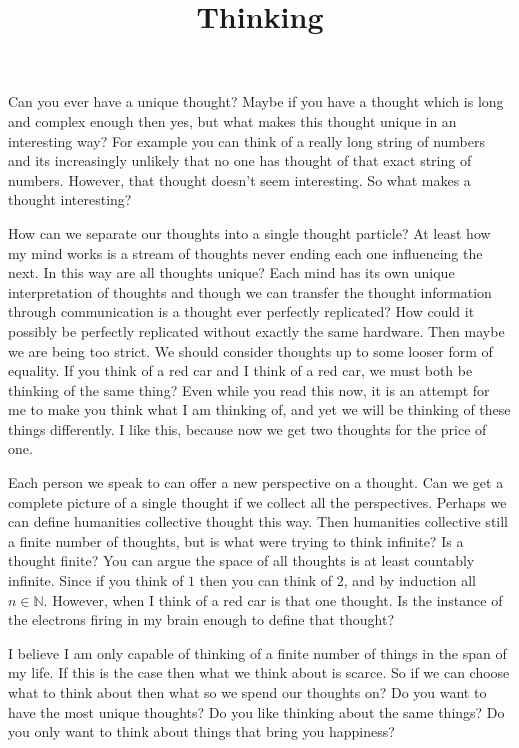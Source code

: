 \documentclass[11pt]{ekblite}
\begin{document}
\title{Thinking}
\maketitle


Can you ever have a unique thought? 
Maybe if you have a thought which is long and complex enough then yes, but what makes this thought unique in an interesting way?
For example you can think of a really long string of numbers and its increasingly unlikely that no one has thought of that exact string of numbers.
However, that thought doesn't seem interesting.
So what makes a thought interesting?

How can we separate our thoughts into a single thought particle?
At least how my mind works is a stream of thoughts never ending each one influencing the next.
In this way are all thoughts unique? 
Each mind has its own unique interpretation of thoughts and though we can transfer the thought information through communication is a thought ever perfectly replicated?
How could it possibly be perfectly replicated without exactly the same hardware.
Then maybe we are being too strict.
We should consider thoughts up to some looser form of equality.
If you think of a red car and I think of a red car, we must both be thinking of the same thing?
Even while you read this now, it is an attempt for me to make you think what I am thinking of, and yet we will be thinking of these things differently.
I like this, because now we get two thoughts for the price of one.

Each person we speak to can offer a new perspective on a thought. 
Can we get a complete picture of a single thought if we collect all the perspectives.
Perhaps we can define humanities collective thought this way.
Then humanities collective still a finite number of thoughts, but is what were trying to think infinite?
Is a thought finite?
You can argue the space of all thoughts is at least countably infinite.
Since if you think of $1$ then you can think of $2$, and by induction all $n\in\mathbb{N}$.
However, when I think of a red car is that one thought.
Is the instance of the electrons firing in my brain enough to define that thought?

I believe I am only capable of thinking of a finite number of things in the span of my life.
If this is the case then what we think about is scarce.
So if we can choose what to think about then what so we spend our thoughts on?
Do you want to have the most unique thoughts?
Do you like thinking about the same things?
Do you only want to think about things that bring you happiness?
\end{document}
